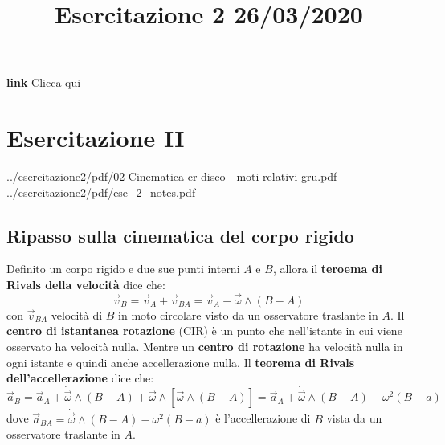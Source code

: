 \title{Esercitazione 2 26/03/2020}\newline
\textbf{link} \href{https://web.microsoftstream.com/video/c4d111d7-4825-4513-afe0-f0fd323398dd}{Clicca qui}
\section{Esercitazione II}
\url{../esercitazione2/pdf/02-Cinematica cr disco - moti relativi gru.pdf}\newline
\url{../esercitazione2/pdf/ese_2_notes.pdf}\newline
\subsection{Ripasso sulla cinematica del corpo rigido}
Definito un corpo rigido e due sue punti interni $A$ e $B$, allora il \textbf{teroema di Rivals della velocità} dice che:
\[
    \vec{v}_B = \vec{v}_A + \vec{v}_{BA} = \vec{v}_A + \vec{\omega} \land (B-A)
\]
con $\vec{v}_{BA}$ velocità di $B$ in moto circolare visto da un osservatore traslante in $A$.\newline
\newline
Il \textbf{centro di istantanea rotazione} (CIR) è un punto che nell'istante in cui viene osservato ha velocità nulla. Mentre un \textbf{centro di rotazione} ha velocità nulla in ogni istante e quindi anche accellerazione nulla.\newline
\newline
Il \textbf{teorema di Rivals dell'accellerazione} dice che:
\[
    \vec{a}_B = \vec{a}_A + \dot{\vec{\omega}} \land (B-A) + \vec{\omega} \land [\vec{\omega} \land (B-A)] = \vec{a}_A + \dot{\vec{\omega}} \land (B-A) - \omega^2 (B-a)
\]
dove $\vec{a}_{BA} = \dot{\vec{\omega}} \land (B-A) - \omega^2 (B-a)$ è l'accellerazione di $B$ vista da un osservatore traslante in $A$.
